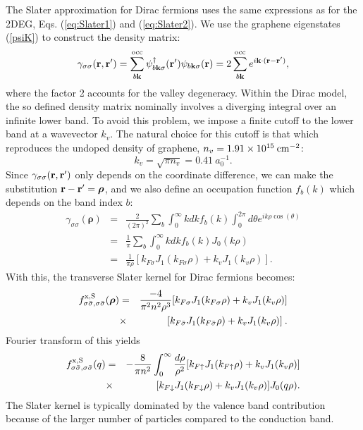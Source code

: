 \documentclass[aps,prb,twocolumn,superscriptaddress]{revtex4-2}
\newcommand{\si}{\sigma}
\newcommand{\sib}{{\bar{\sigma}}}
\newcommand{\bfk}{{\bf k}}
\newcommand{\bfr}{{\bf r}}
\newcommand{\bfrho}{{\bm{\rho}}}
\newcommand{\bfrp}{{\bfr{'}}}
\newcommand{\ua}{\uparrow}
\newcommand{\da}{\downarrow}
\newcommand{\ku}{k_{F\ua}}
\newcommand{\kd}{k_{F\da}}
\newcommand{\ks}{k_{F\si}}
\newcommand{\ksb}{k_{F\sib}}
\begin{document}
The Slater approximation for Dirac fermions uses the same expressions as for the 2DEG, Eqs. (\ref{eq:Slater1}) and (\ref{eq:Slater2}).
We use the graphene eigenstates (\ref{psiK}) to construct the density matrix:
\begin{equation}
\gamma_{\sigma\sigma}(\bfr,\bfr')
=
\sum_{b\bfk}^{\rm occ} \psi_{b \bfk \sigma}^\dagger(\bfrp)\psi_{b \bfk \sigma}(\bfr)
=
2\sum_{b\bfk}^{\rm occ}e^{i\bfk\cdot(\bfr-\bfrp)},
\end{equation}
where the factor 2 accounts for the valley degeneracy. Within the Dirac model, the so defined density matrix
nominally involves a diverging integral over an infinite lower band. To avoid this problem,
we impose a finite cutoff to the lower band at a wavevector $k_v$.
The natural choice for this cutoff is that which reproduces the undoped density of graphene, $n_v= 1.91 \times 10^{15}\: \rm cm^{-2}$:
\begin{equation}\label{cutoff}
  k_v = \sqrt{\pi n_v} = 0.41 \  a_0^{-1}.
\end{equation}
Since $\gamma_{\sigma\sigma}(\bfr,\bfr')$ only depends on the coordinate difference, we can make the substitution $\bfr-\bfrp = \bfrho$,
and we also define an occupation function $f_b(k)$ which depends on the band index $b$:
\begin{eqnarray}
\gamma_{\sigma\sigma}(\bfrho)
&=&
\frac{2}{(2\pi)^2}\sum_{b}\int_0^\infty k dk f_b(k) \int_0^{2\pi}d\theta e^{i k \rho \cos(\theta)} \nonumber\\
&=&
 \frac{1}{\pi}\sum_b\int_0^\infty k dk f_b(k)J_0(k\rho) \nonumber\\
&=& \frac{1}{\pi\rho}[\ks J_1(\ks \rho)+k_vJ_1(k_v \rho)].
\end{eqnarray}
With this, the transverse Slater kernel for Dirac fermions becomes:
\begin{eqnarray}
f^{\rm x,S}_{\sigma\bar\sigma,\sigma\bar\sigma}(\bfrho) &=& \frac{-4}{\pi^2 n^2 \rho^3}[\ks J_1(\ks \rho)+k_vJ_1(k_v \rho)]\nonumber\\
&\times&
[\ksb J_1(\ksb \rho)+k_vJ_1(k_v \rho)] \: .
	  \label{eq:SlaterKernelDiracR}
\end{eqnarray}
Fourier transform of this yields
\begin{eqnarray}
f^{\rm x,S}_{\sigma\bar\sigma,\sigma\bar\sigma}(q)
&=&
-\frac{8}{\pi n^2}\int_0^\infty \frac{d\rho}{\rho^2}  [\ku J_1(\ku\rho)+k_v J_1(k_v\rho)]\nonumber\\
&\times&
[\kd J_1(\kd\rho)+k_v J_1(k_v\rho)]J_0(q\rho).
\end{eqnarray}
The Slater kernel is typically dominated by the valence band contribution because of the larger number of particles compared to the conduction band.
\end{document}
